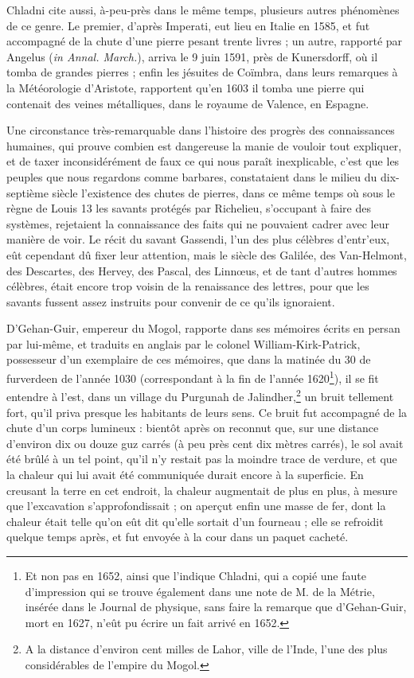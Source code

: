 \documentclass[a4paper, 12pt, oneside, french]{article}
\begin{document}
Chladni cite aussi, à-peu-près dans le même temps, plusieurs autres phénomènes de ce genre. Le premier, d'après Imperati, eut lieu en Italie en 1585, et fut accompagné de la chute d'une pierre pesant trente livres ; un autre, rapporté par Angelus (\emph{in Annal. March.}), arriva le 9 juin 1591, près de Kunersdorff, où il tomba de grandes pierres ; enfin les jésuites de Coïmbra, dans leurs remarques à la Météorologie d'Aristote, rapportent qu'en 1603 il tomba une pierre qui contenait des veines métalliques, dans le royaume de Valence, en Espagne.

Une circonstance très-remarquable dans l'histoire des progrès des connaissances humaines, qui prouve combien est dangereuse la manie de vouloir tout expliquer, et de taxer inconsidérément de faux ce qui nous paraît inexplicable, c'est que les peuples que nous regardons comme barbares, constataient dans le milieu du dix-septième siècle l'existence des chutes de pierres, dans ce même temps où sous le règne de Louis 13 les savants protégés par Richelieu, s'occupant à faire des systèmes, rejetaient la connaissance des faits qui ne pouvaient cadrer avec leur manière de voir. Le récit du savant Gassendi, l'un des plus célèbres d'entr'eux, eût cependant dû fixer leur attention, mais le siècle des Galilée, des Van-Helmont, des Descartes, des Hervey, des Pascal, des Linnœus, et de tant d'autres hommes célèbres, était encore trop voisin de la renaissance des lettres, pour que les savants fussent assez instruits pour convenir de ce qu'ils ignoraient.

D'Gehan-Guir, empereur du Mogol, rapporte dans ses mémoires écrits en persan par lui-même, et traduits en anglais par le colonel William-Kirk-Patrick, possesseur d'un exemplaire de ces mémoires, que dans la matinée du 30 de furverdeen de l'année 1030 (correspondant à la fin de l'année 1620\footnote{Et non pas en 1652, ainsi que l'indique Chladni, qui a copié une faute d'impression qui se trouve également dans une note de M. de la Métrie, insérée dans le Journal de physique, sans faire la remarque que d'Gehan-Guir, mort en 1627, n'eût pu écrire un fait arrivé en 1652.}), il se fit entendre à l'est, dans un village du Purgunah de Jalindher,\footnote{A la distance d'environ cent milles de Lahor, ville de l'Inde, l'une des plus considérables de l'empire du Mogol.} un bruit tellement fort, qu'il priva presque les habitants de leurs sens. Ce bruit fut accompagné de la chute d'un corps lumineux : bientôt après on reconnut que, sur une distance d'environ dix ou douze guz carrés (à peu près cent dix mètres carrés), le sol avait été brûlé à un tel point, qu'il n'y restait pas la moindre trace de verdure, et que la chaleur qui lui avait été communiquée durait encore à la superficie. En creusant la terre en cet endroit, la chaleur augmentait de plus en plus, à mesure que l'excavation s'approfondissait ; on aperçut enfin une masse de fer, dont la chaleur était telle qu'on eût dit qu'elle sortait d'un fourneau ; elle se refroidit quelque temps après, et fut envoyée à la cour dans un paquet cacheté.
\end{document}
